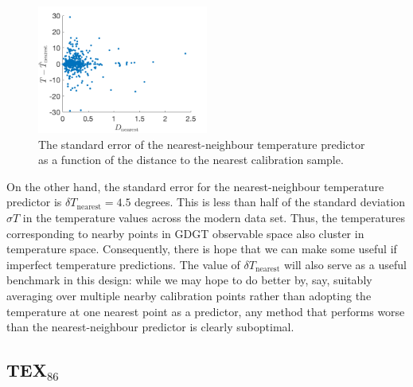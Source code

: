 \documentclass[rmp,aps,twocolumn]{revtex4-1}
\begin{document}
\begin{figure}
	\centering
	\includegraphics[width=0.5\textwidth]{Tnearest.png}
	\caption{\label{fig:Tnearest}  The standard error of the nearest-neighbour temperature predictor as a function of the distance to the nearest calibration sample.}
\end{figure}

On the other hand, the standard error for the nearest-neighbour temperature predictor is $\delta T_\mathrm{nearest} = 4.5$ degrees.  This is less than half of the standard deviation $\sigma T$ in the temperature values across the modern data set. Thus, the temperatures corresponding to nearby points in GDGT observable space also cluster in temperature space.  Consequently, there is hope that we can make some useful if imperfect temperature predictions.  The value of $\delta T_\mathrm{nearest}$ will also serve as a useful benchmark in this design: while we may hope to do better by, say, suitably averaging over multiple nearby calibration points rather than adopting the temperature at one nearest point as a predictor, any method that performs worse than the nearest-neighbour predictor is clearly suboptimal. 

\subsection{TEX$_{86}$}
\end{document}
